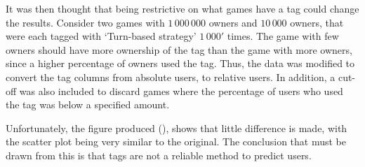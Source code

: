 \documentclass[dataset.tex]{subfiles}
\begin{document}
It was then thought that being restrictive on what games have a tag could change
the results. Consider two games with \(1\,000\,000\) owners and \(10\,000\)
owners, that were each tagged with `Turn-based strategy' \(1\,000'\) times. The
game with few owners should have more ownership of the tag than the game with
more owners, since a higher percentage of owners used the tag. Thus, the data
was modified to convert the tag columns from absolute users, to relative users.
In addition, a cut-off was also included to discard games where the percentage
of users who used the tag was below a specified amount.

Unfortunately, the figure produced (), shows that
little difference is made, with the scatter plot being very similar to the
original. The conclusion that must be drawn from this is that tags are not a
reliable method to predict users.
\end{document}
